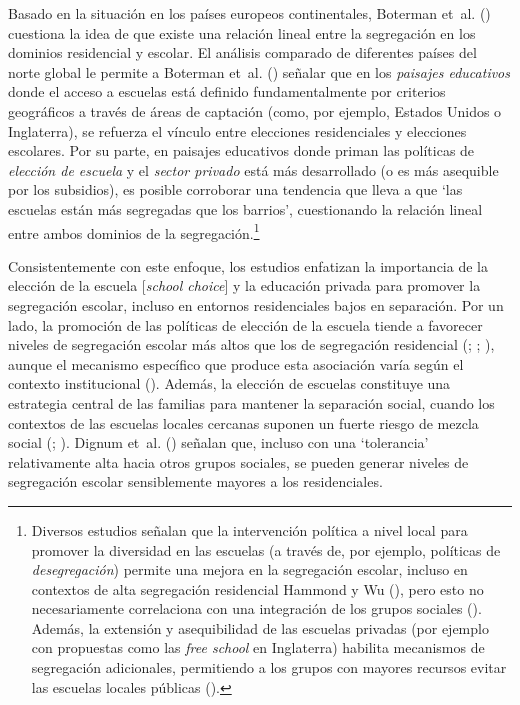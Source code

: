 \documentclass[
  spanish,
  a4paper,%
  chapterprefix=true,%
  DIV=calc,%
  twoside]{scrbook}%
\begin{document}
Basado en la situación en los países europeos continentales,
Boterman et~al. () cuestiona la idea de que existe una relación
lineal entre la segregación en los dominios residencial y escolar. El
análisis comparado de diferentes países del norte global le permite a
Boterman et~al. () señalar que en los \emph{paisajes
educativos}
donde el acceso a escuelas está definido fundamentalmente por criterios
geográficos a través de áreas de captación (como, por ejemplo, Estados
Unidos o Inglaterra), se refuerza el vínculo entre elecciones
residenciales y elecciones escolares. Por su parte, en paisajes
educativos donde priman las políticas de \emph{elección de escuela} y el
\emph{sector privado} está más desarrollado (o es más asequible por los
subsidios), es posible corroborar una tendencia que lleva a que `las
escuelas están más segregadas que los barrios', cuestionando la relación
lineal entre ambos dominios de la
segregación.\footnote{Diversos estudios señalan que la
  intervención política a nivel local para promover la diversidad en
  las escuelas (a través de, por ejemplo, políticas de
  \emph{desegregación}) permite una mejora en la segregación escolar,
  incluso en contextos de alta segregación residencial Hammond y Wu (), pero esto no
  necesariamente correlaciona con una integración de los grupos
  sociales (). Además, la extensión y asequibilidad de las
  escuelas privadas (por ejemplo con propuestas como las \emph{free school}
  en Inglaterra) habilita mecanismos de segregación adicionales,
  permitiendo a los grupos con mayores recursos evitar las escuelas
  locales públicas ().}

Consistentemente con este enfoque, los estudios enfatizan la importancia
de la elección de la escuela {[}\emph{school choice}{]} y la educación privada
para promover la segregación escolar, incluso en entornos residenciales
bajos en separación. Por un lado, la
promoción de las políticas de elección de la escuela tiende a favorecer
niveles de segregación escolar más altos que los de segregación
residencial (; ; ), aunque el
mecanismo específico que produce esta asociación varía según el contexto
institucional (). Además, la elección de escuelas constituye
una estrategia central de las familias para mantener la separación
social, cuando los contextos de las escuelas locales cercanas suponen un
fuerte riesgo de mezcla social (; ).
Dignum et~al. () señalan que, incluso con una `tolerancia' relativamente alta
hacia otros grupos sociales, se pueden generar niveles de segregación
escolar sensiblemente mayores a los residenciales.
\end{document}
